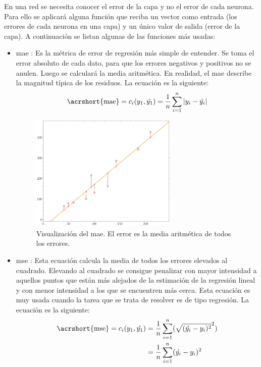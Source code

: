 En una red se necesita conocer el error de la capa y no el error de cada neurona. Para ello se aplicará alguna función que reciba un vector como entrada (los errores de cada neurona en una capa) y un único valor de salida (error de la capa). A continuación se listan algunas de las funciones más usadas\cite{tensorflow2015-whitepaper}:


\begin{itemize}
\item \acrfull{mae} \cite{errors_basics} \label{MAE_loss}: Es la métrica de error de regresión más simple de entender. Se toma el error absoluto de cada dato, para que los errores negativos y positivos no se anulen. Luego se calculará la media aritmética. En realidad, el \acrshort{mae} describe la magnitud típica de los residuos. La ecuación es la siguiente:
\begin{equation}
\centering
    \begin{split}
        \text{\acrshort{mae}} = c_i(y_1, \hat{y_1}) = \frac{1}{n} \sum_{i=1}^n |y_i - \hat{y_i}|
    \end{split}
\end{equation}

\begin{figure}[H]
    \centering
    \includegraphics[width=7cm]{images/state-of-art/cost-function/mae.png}
    \caption{Visualización del \acrshort{mae}. El error es la media aritmética de todos los errores.}
    \label{fig:error_mae}
\end{figure}

\item \acrfull{mse} \cite{errors_basics}\label{MSE_loss}: Esta ecuación calcula la media de todos los errores elevados al cuadrado. Elevando al cuadrado se consigue penalizar con mayor intensidad a aquellos puntos que están más alejados de la estimación de la regresión lineal y con menor intensidad a los que se encuentren más cerca. Esta ecuación es muy usada cuando la tarea que se trata de resolver es de tipo regresión. La ecuación es la siguiente:
\begin{equation}
\centering
    \begin{split}
        \text{\acrshort{mse}} = c_i(y_1, \hat{y_1}) &= \frac{1}{n} \sum_{i=1}^n (\sqrt{(\hat{y_i} - y_i)^2}^2) \\
        & = \frac{1}{n} \sum_{i=1}^n (\hat{y_i} - y_i)^2
    \end{split}
\end{equation}


\end{itemize}
